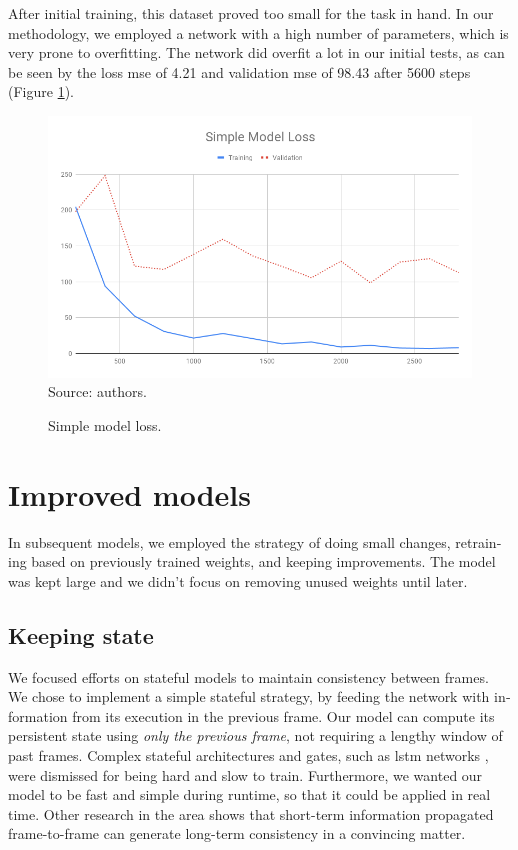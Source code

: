 \documentclass[12pt,openright,oneside,a4paper,english, brazilian]{abntex2}
\begin{document}
\begin{otherlanguage}{english}
After initial training, this dataset proved too small for the task in hand. In our methodology, we employed a network with a high number of parameters, which is very prone to overfitting. The network did overfit a lot in our initial tests, as can be seen by the loss \acrshort{mse} of 4.21 and validation \acrshort{mse} of 98.43 after 5600 steps (Figure \ref{simple_loss}).

\begin{figure}[!htb]
\centering
\caption{Simple model loss.}
\includegraphics[width=\textwidth]{loss/Simple}
Source: authors.
\label{simple_loss}
\end{figure}

\section{Improved models}

In subsequent models, we employed the strategy of doing small changes, retraining based on previously trained weights, and keeping improvements. The model was kept large and we didn't focus on removing unused weights until later.

\subsection{Keeping state}
\label{keeping_state}

We focused efforts on stateful models to maintain consistency between frames. We chose to implement a simple stateful strategy, by feeding the network with information from its execution in the previous frame. Our model can compute its persistent state using \textit{only the previous frame}, not requiring a lengthy window of past frames. Complex stateful architectures and gates, such as \acrshort{lstm} networks \cite{lstm}, were dismissed for being hard and slow to train. Furthermore, we wanted our model to be fast and simple during runtime, so that it could be applied in real time. Other research in the area \cite{MSFT_transfer}
shows that short-term information propagated frame-to-frame can generate long-term consistency in a convincing matter.


\end{otherlanguage}
\end{document}
